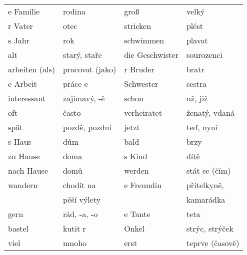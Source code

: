     \begin{widetext}
     \centering
      \begin{tabular}{llll}  
        \hline
          e Familie          & rodina                & groß            & velký                 \\
          r Vater            & otec                  & stricken        & plést                 \\
          s Jahr             & rok                   & schwimmen       & plavat                \\
          alt                & starý, staře          & die Geschwister & sourozenci            \\
          arbeiten (als)     & pracovat (jako)       & r Bruder        & bratr                 \\
          e Arbeit           & práce e               & Schwester       & sestra                \\
          interessant        & zajímavý, -ě          & schon           & už, již               \\
          oft                & často                 & verheiratet     & ženatý, vdaná         \\
          spät               & pozdě, pozdní         & jetzt           & teď, nyní             \\
          s Haus             & dům                   & bald            & brzy                  \\
          zu Hause           & doma                  & s Kind          & dítě                  \\
          nach Hause         & domů                  & werden          & stát se (čím)         \\
          wandern            & chodit na             & e Freundin      & přítelkyně,           \\ 
                             & pěší výlety           &                 & kamarádka             \\
          gern               & rád, -a, -o           & e Tante         & teta                  \\
          bastel             & kutit r               & Onkel           & strýc, strýček        \\
          viel               & mnoho                 & erst            & teprve (časově)       \\

\end{tabular}
\end{widetext}

